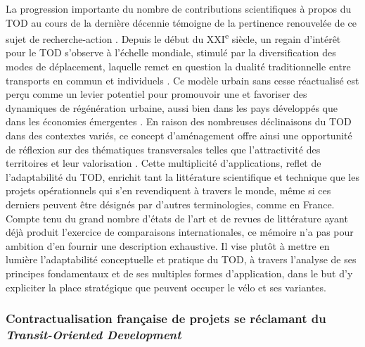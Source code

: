 \begin{refsegment}
La progression importante du nombre de contributions scientifiques à propos du \acrshort{TOD} au cours de la dernière décennie témoigne de la pertinence renouvelée de ce sujet de recherche-action \textcolor{blue}{\autocite[2545]{jain_systematic_2020}}. Depuis le début du XXI\textsuperscript{e} siècle, un regain d’intérêt pour le \acrshort{TOD} s’observe à l’échelle mondiale, stimulé par la diversification des modes de déplacement, laquelle remet en question la dualité traditionnelle entre transports en commun et individuels \textcolor{blue}{\autocite[3]{knowles_transit_2019}}. Ce modèle urbain sans cesse réactualisé est perçu comme un levier potentiel pour promouvoir une  et favoriser des dynamiques de régénération urbaine, aussi bien dans les pays développés que dans les économies émergentes \textcolor{blue}{\autocite[2~191]{goetz_suburban_2013}}. En raison des nombreuses déclinaisons du \acrshort{TOD} dans des contextes variés, ce concept d'aménagement offre ainsi une opportunité de réflexion sur des thématiques transversales telles que l’attractivité des territoires et leur valorisation \textcolor{blue}{\autocite[34]{stransky_periurbain_2019}}. Cette multiplicité d’applications, reflet de l’adaptabilité du \acrshort{TOD}, enrichit tant la littérature scientifique et technique que les projets opérationnels qui s’en revendiquent à travers le monde, même si ces derniers peuvent être désignés par d’autres terminologies, comme en France. Compte tenu du grand nombre d'états de l'art et de revues de littérature ayant déjà produit l'exercice de comparaisons internationales, ce mémoire n’a pas pour ambition d’en fournir une description exhaustive. Il vise plutôt à mettre en lumière l’adaptabilité conceptuelle et pratique du \acrshort{TOD}, à travers l’analyse de ses principes fondamentaux et de ses multiples formes d’application, dans le but d'y expliciter la place stratégique que peuvent occuper le vélo et ses variantes.%

\subsubsection*{Contractualisation française de projets se réclamant du \textsl{Transit-Oriented Development}
    \label{chap1:tod-presentation-generale-definition-instruments}
    }


\end{refsegment}
